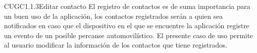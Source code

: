 
\begin{UseCase}{CUGC1.1.3}{Editar contacto}
    {
	El registro de contactos es de suma importancia para un buen uso de la aplicación, los contactos registrados serán a quien sea notificados en caso que el dispositivo en el que se encuentre la aplicación registre un evento de un posible percanse automovilístico. El presente caso de uso permite al usuario modificar la información de los contactos que tiene registrados.
    }

\end{UseCase}
